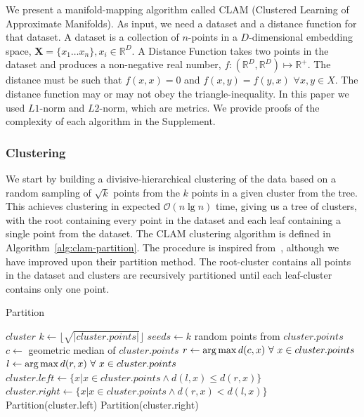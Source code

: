We present a manifold-mapping algorithm called CLAM (Clustered Learning of Approximate Manifolds).
As input, we need a dataset and a distance function for that dataset.
A dataset is a collection of $n$-points in a $D$-dimensional embedding space, $\textbf{X} = \{x_1 \dots x_n\}, x_i \in \mathbb{R}^D$.
A Distance Function takes two points in the dataset and produces a non-negative real number, $f : (\mathbb{R}^D, \mathbb{R}^D) \mapsto \mathbb{R}^+$.
The distance must be such that $f(x, x) = 0$ and $f(x, y) = f(y, x)$ $\forall x, y \in X$.
The distance function may or may not obey the triangle-inequality.
In this paper we used $L1$-norm and $L2$-norm, which are metrics.
We provide proofs of the complexity of each algorithm in the Supplement.

\subsubsection{Clustering}
\label{subsubsec:methods:clam:clustering}

We start by building a divisive-hierarchical clustering of the data based on a random sampling of $\sqrt k$ points from the  $k$ points in a given cluster from the tree.
This achieves clustering in expected $\mathcal{O}(n \lg n)$ time, giving us a tree of clusters, with the root containing every point in the dataset and each leaf containing a single point from the dataset.
The CLAM clustering algorithm is defined in Algorithm~\ref{alg:clam-partition}.
The procedure is inspired from~\cite{ishaq2019clustered}, although we have improved upon their partition method.
The root-cluster contains all points in the dataset and clusters are recursively partitioned until each leaf-cluster contains only one point.

\begin{algorithm} %
\caption{Partition} %
\label{alg:clam-partition} %
\begin{algorithmic}[1] %
    \REQUIRE $cluster$
    \STATE $k \leftarrow \lfloor \sqrt{|cluster.points|} \rfloor$
    \STATE $seeds \leftarrow k$ random points from $cluster.points$
    \STATE $c \leftarrow$ geometric median of $cluster.points$
    \STATE $r \leftarrow \operatorname*{arg\,max} d(c,x) \ \forall \ x \in cluster.points$
    \STATE $l \leftarrow \operatorname*{arg\,max} d(r,x) \ \forall \ x \in cluster.points$
    \STATE $cluster.left \leftarrow \{x | x \in cluster.points \land d(l,x) \le d(r,x)\}$
    \STATE $cluster.right \leftarrow \{x | x \in cluster.points \land d(r,x) < d(l,x)\}$
        \STATE Partition(cluster.left)
    \ENDIF
        \STATE Partition(cluster.right)
    \ENDIF
\end{algorithmic}
\end{algorithm}

